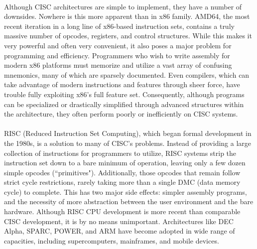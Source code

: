 \documentclass[english]{paper}
\begin{document}
\paragraph{}
Although CISC architectures are simple to implement, they have a number of downsides. Nowhere is this more apparent than in x86 family. AMD64, the most recent iteration in a long line of x86-based instruction sets, contains a truly massive number of opcodes, registers, and control structures. While this makes it very powerful and often very convenient, it also poses a major problem for programming and efficiency. Programmers who wish to write assembly for modern x86 platforms must memorize and utilize a vast array of confusing mnemonics, many of which are sparsely documented. Even compilers, which can take advantage of modern instructions and features through sheer force, have trouble fully exploiting x86's full feature set. Consequently, although programs can be specialized or drastically simplified through advanced structures within the architecture, they often perform poorly or inefficiently on CISC systems. 

\paragraph{}
RISC (Reduced Instruction Set Computing), which began formal development in the 1980s, is a solution to many of CISC's problems. Instead of providing a large collection of instructions for programmers to utilize, RISC systems strip the instruction set down to a bare minimum of operation, leaving only a few dozen simple opcodes (``primitives"). Additionally, those opcodes that remain follow strict cycle restrictions, rarely taking more than a single DMC (data memory cycle) to complete. This has two major side effects: simpler assembly programs, and the necessity of more abstraction between the user environment and the bare hardware. Although RISC CPU development is more recent than comparable CISC development, it is by no means unimportant. Architectures like DEC Alpha, SPARC, POWER, and ARM have become adopted in wide range of capacities, including supercomputers, mainframes, and mobile devices.
\end{document}
